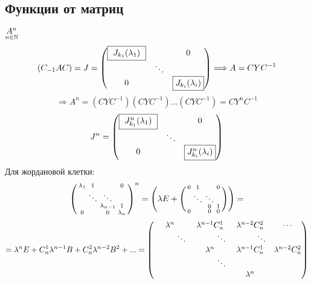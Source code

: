     \subsection{Функции от матриц}
    $\underset{n \in \mathbb N}{A^n}$ 
    $$(C_{-1}AC) = J = \begin{pmatrix}
        \text{\fbox{ $J_{k_1}(\lambda_1)$ }} & \null & 0\\
        \null & \ddots \\
        0 & \null & \text{\fbox{$J_{k_i}(\lambda_i)$}}
    \end{pmatrix} \Longrightarrow A = CYC^{-1}$$ 
    $$\Longrightarrow A^n = (CYC^{-1})(CYC^{-1})...(CYC^{-1}) = CY^nC^{-1}$$
    $$J^n = \begin{pmatrix}
        \text{\fbox{ $J_{k_1}^n(\lambda_1)$ }} & \null & 0\\
        \null & \ddots \\
        0 & \null & \text{\fbox{$J_{k_i}^n(\lambda_i)$}}
    \end{pmatrix}$$
    Для жордановой клетки: 
    $$\left(\begin{smallmatrix}
        \lambda_1 & 1 & \null & 0 \\
        \null & \ddots & \ddots & \null \\
        \null & \null & \lambda_{n-1} & 1 \\
        0 & \null & 0 & \lambda_n 
    \end{smallmatrix}\right)^n = \left(\lambda E + \left(\begin{smallmatrix}
        0 & 1 & \null & 0 \\
        \null & \ddots & \ddots & \null \\
        \null & \null & 0 & 1 \\
        0 & \null & 0 & 0 
    \end{smallmatrix}\right)\right) =$$ 
    $$= \lambda^n E + C_n^1 \lambda^{n-1}B + C_n^2 \lambda^{n-2}B^2 + ... = \begin{pmatrix}
        \lambda^n & \lambda^{n-1}C_n^1 & \lambda^{n-2}C_n^2 & \cdots\\
        \tab[1cm] \ddots & \tab[1cm] \ddots & \tab[1cm] \ddots \\
        \null & \lambda^n & \lambda^{n-1}C_n^1 & \lambda^{n-2}C_n^2\\
        \tab[1cm] \null & \tab[1cm] \ddots \\
        \null & \null & \lambda^n 
    \end{pmatrix}$$
